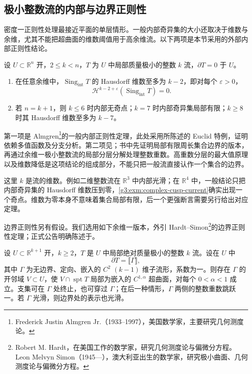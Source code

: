 \subsection{极小整数流的内部与边界正则性}
\label{g3:subsec:2303:04}
密度一正则性处理最接近平面的单层情形。一般内部奇异集的大小还取决于维数与余维，尤其不能把超曲面的维数阈值用于高余维流。以下两项是本节采用的外部内部正则性结论。

\begin{theorem}\label{g3:thm:area-minimizing-interior-singular-bounds}
	设 \(U\subset\mathbb R^n\) 开，\(2\le k<n\)，\(T\) 为 \(U\) 中局部质量极小的整数 \(k\) 流，\(\partial T=0\) 于 \(U\)。
	\begin{enumerate}
		\item 在任意余维中，\(\operatorname{Sing}_{\mathrm{int}}T\) 的 Hausdorff 维数至多为 \(k-2\)，即对每个 \(\varepsilon>0\)，
		\[
			\mathcal H^{k-2+\varepsilon}(\operatorname{Sing}_{\mathrm{int}}T)=0.
		\]
		\item 若 \(n=k+1\)，则 \(k\le6\) 时内部无奇点；\(k=7\) 时内部奇异集局部有限；\(k\ge8\) 时其 Hausdorff 维数至多为 \(k-7\)。
	\end{enumerate}
\end{theorem}

第一项是 Almgren\footnote{Frederick Justin Almgren Jr.（1933--1997），美国数学家，主要研究几何测度论。}的一般内部正则性定理，此处采用\cite[第36节，第210--211页]{Simon1983}所陈述的 Euclid 特例，证明依赖多值函数及分支分析。第二项见\cite[第37节，尤其定理37.7及其证明，第215--223页]{Simon1983}；书中先证明局部有限周长集合边界的版本，再通过余维一极小整数流的局部分层分解处理整数重数。高重数分层的最大值原理以及维数降低是这项结论的组成部分，不能只把一般流直接认作一个集合的边界。

\ProseParagraphBreak
这里 \(k\) 是流的维数。例如二维整数流在 \(\mathbb R^3\) 中内部光滑；在 \(\mathbb R^4\) 中，一般结论只把内部奇异集的 Hausdorff 维数压到零，\cref{g3:exm:complex-cusp-current}确实出现一个奇点。维数为零本身不意味着集合局部有限，后一个更强断言需要另行给出对应定理。

\ProseParagraphBreak
边界正则性另有假设。我们选用如下余维一版本，外引 Hardt--Simon\footnote{Robert M. Hardt，在美国工作的数学家，研究几何测度论与偏微分方程。Leon Melvyn Simon（1945—），澳大利亚出生的数学家，研究极小曲面、几何测度论与偏微分方程。}的边界正则性定理；正式公告明确陈述于\cite[定理2，第263--264页]{HardtSimon1979BoundaryAnnouncement}。

\begin{theorem}\label{g3:thm:hardt-simon-boundary-regularity}
	设 \(U\subset\mathbb R^{k+1}\) 开，\(k\ge2\)，\(T\) 是 \(U\) 中局部绝对质量极小的整数 \(k\) 流。设在 \(U\) 中
	\[
		\partial T=\lBrack\Gamma\rBrack,
	\]
	其中 \(\Gamma\) 为无边界、定向、嵌入的 \(C^2\) \((k-1)\) 维子流形，系数为一。则存在 \(\Gamma\) 的开邻域 \(V\subset U\)，使 \(V\cap\operatorname{spt}T\) 局部为嵌入的 \(C^{1,\alpha}\) 超曲面，对每个 \(0<\alpha<1\) 成立。支集可在 \(\Gamma\) 处终止，也可穿过 \(\Gamma\)；在后一种情形，\(\Gamma\) 两侧的整数重数跳跃一。若 \(\Gamma\) 光滑，则边界处的表示也光滑。
\end{theorem}

